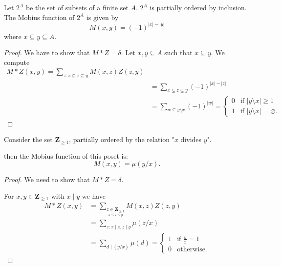 \begin{lemma}
Let $2^{A}$ be the set of subsets of a finite set $A$. $2^{A}$ is partially ordered by inclusion. The Mobius function of $2^{A}$ is given by
$$
M(x,y)=(-1)^{|x|-|y|}
$$
where $x\subseteq y\subseteq A$.
\end{lemma}
\begin{proof}
We have to show that $M*Z=\delta$. Let $x,y\subseteq A$ such that $x\subseteq y$. We compute
\begin{align*}
M*Z(x,y)=\sum _{z:x \subseteq z \subseteq y} M(x,z)Z(z,y) \\
 & =\sum _{x \subseteq z \subseteq y}(-1)^{|x|-|z| } \\
 & =\sum _{w\subseteq y\setminus x} (-1)^{|w|}=\begin{cases}
0 & \text{if }|y\setminus x| \ge 1 \\
1 & \text{if }|y\setminus x|=\varnothing.
\end{cases}
\end{align*}
\end{proof}
\begin{lemma}
Consider the set $\mathbf{Z}_{\ge 1}$, partially ordered by the relation "$x$ divides $y$".

then the Mobius function of this poset is:
$$
M(x,y)=\mu(y/x).
$$
\end{lemma}
\begin{proof}
We need to show that $M*Z=\delta$.

For $x,y\in \mathbf{Z}_{\ge 1}$ with $x\mid y$ we have
\begin{align*}
M*Z(x,y) & =\sum _{\underset{x\le z \le y}{z\in \mathbf{Z}_{\ge 1}}} M(x,z)Z(z,y)  \\
 & =\sum _{z:x \mid z, z\mid y} \mu(z/x) \\
 & =\sum _{d\mid (y/x)} \mu(d)=
\begin{cases}
1 & \text{if } \frac{y}{x}=1 \\
0 & \text{otherwise.}
\end{cases}
\end{align*}
\end{proof}